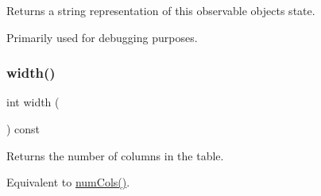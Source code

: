 Returns a string representation of this observable object\textquotesingle{}s state. 

Primarily used for debugging purposes. \mbox{\label{classGTable_ad72663daf610f2a0833a2fc3d78e4fdf}} 
\subsubsection{\texorpdfstring{width()}{width()}}
{\footnotesize\ttfamily int width (\begin{DoxyParamCaption}{ }\end{DoxyParamCaption}) const\hspace{0.3cm}{\ttfamily [virtual]}}



Returns the number of columns in the table. 

Equivalent to \mbox{\hyperlink{classGTable_a5997e103e56aae1db12e1f7f02e136c5}{num\+Cols()}}. 